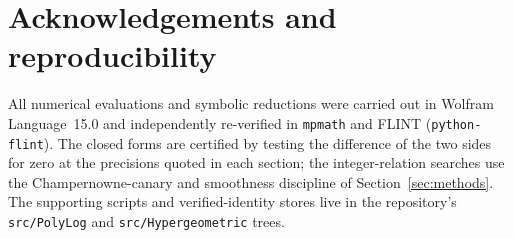 \documentclass[11pt]{article}
\theoremstyle{plain}
\theoremstyle{remark}
\begin{document}
\section*{Acknowledgements and reproducibility}
All numerical evaluations and symbolic reductions were carried out in Wolfram Language~15.0 and
independently re-verified in \texttt{mpmath} and FLIN\-T (\texttt{python-flint}). The closed forms
are certified by testing the difference of the two sides for zero at the precisions quoted in each
section; the integer-relation searches use the Champernowne-canary and smoothness discipline of
Section~\ref{sec:methods}. The supporting scripts and verified-identity stores live in the
repository's \texttt{src/PolyLog} and \texttt{src/Hypergeometric} trees.
\end{document}
